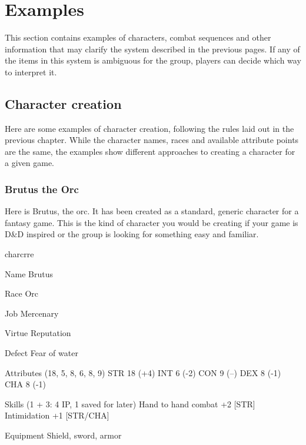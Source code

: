 \chapter{Examples}

This section contains examples of characters, combat sequences and other information that may clarify the system described in the previous pages. If any of the items in this system is ambiguous for the group, players can decide which way to interpret it.

\section{Character creation}

Here are some examples of character creation, following the rules laid out in the previous chapter. While the character names, races and available attribute points are the same, the examples show different approaches to creating a character for a given game. 

\subsection*{Brutus the Orc}

Here is Brutus, the orc. It has been created as a standard, generic character for a fantasy game. This is the kind of character you would be creating if your game is D\&D inspired or the group is looking for something easy and familiar.

\begin{labeling}{charcrre}
\item [Name] Brutus
\item [Race] Orc
\item [Job] Mercenary
\item [Virtue] Reputation
\item [Defect] Fear of water
\item [Attributes] (18, 5, 8, 6, 8, 9) \linebreak
STR 18 (+4)\linebreak
INT 6  (-2)\linebreak
CON 9  (--)\linebreak
DEX 8  (-1)\linebreak
CHA 8  (-1)\linebreak
\item [Skills] (1 + 3: 4 IP, 1 saved for later)\linebreak
Hand to hand combat +2 [STR]\linebreak
Intimidation +1 [STR/CHA]
\item [Equipment] Shield, sword, armor
\end{labeling}

